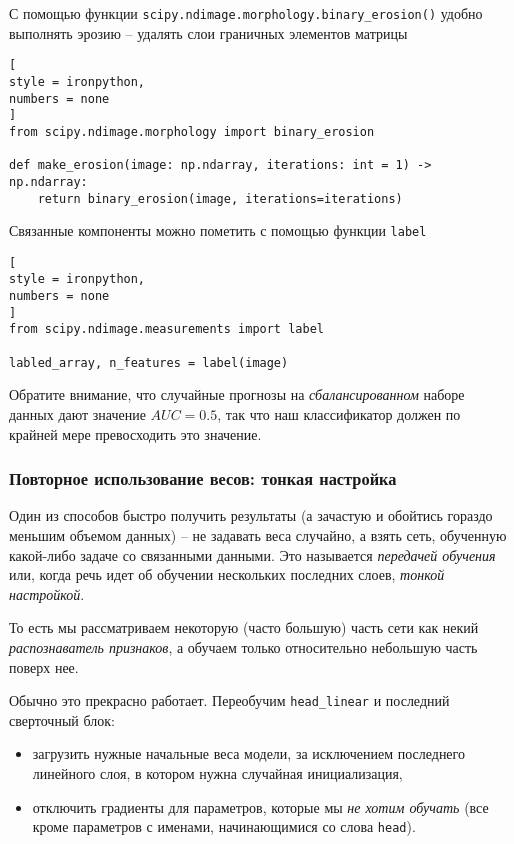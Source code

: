 \documentclass[%
	11pt,
	a4paper,
	utf8,
		]{article}
\begin{document}
С помощью функции \verb|scipy.ndimage.morphology.binary_erosion()| удобно выполнять эрозию -- удалять слои граничных элементов матрицы
\begin{lstlisting}[
style = ironpython,
numbers = none
]
from scipy.ndimage.morphology import binary_erosion

def make_erosion(image: np.ndarray, iterations: int = 1) -> np.ndarray:
    return binary_erosion(image, iterations=iterations)
\end{lstlisting}

Связанные компоненты можно пометить с помощью функции \verb|label|
\begin{lstlisting}[
style = ironpython,
numbers = none
]
from scipy.ndimage.measurements import label

labled_array, n_features = label(image)
\end{lstlisting}

Обратите внимание, что случайные прогнозы на \emph{сбалансированном} наборе данных дают значение $AUC = 0.5$, так что наш классификатор должен по крайней мере превосходить это значение.

\subsubsection{Повторное использование весов: тонкая настройка}

Один из способов быстро получить результаты (а зачастую и обойтись гораздо меньшим объемом данных) -- не задавать веса случайно, а взять сеть, обученную какой-либо задаче со связанными данными. Это называется \emph{передачей обучения} или, когда речь идет об обучении нескольких последних слоев, \emph{тонкой настройкой}. 

То есть мы рассматриваем некоторую (часто большую) часть сети как некий \emph{распознаватель признаков}, а обучаем только относительно небольшую часть поверх нее.

Обычно это прекрасно работает. Переобучим \verb|head_linear| и последний сверточный блок:
\begin{itemize}
	\item загрузить нужные начальные веса модели, за исключением последнего линейного слоя, в котором нужна случайная инициализация,
	
	\item {\color{blue}отключить градиенты для параметров, которые мы \emph{не хотим обучать} (все кроме параметров с именами, начинающимися со слова \verb|head|)}.
\end{itemize}
\end{document}
